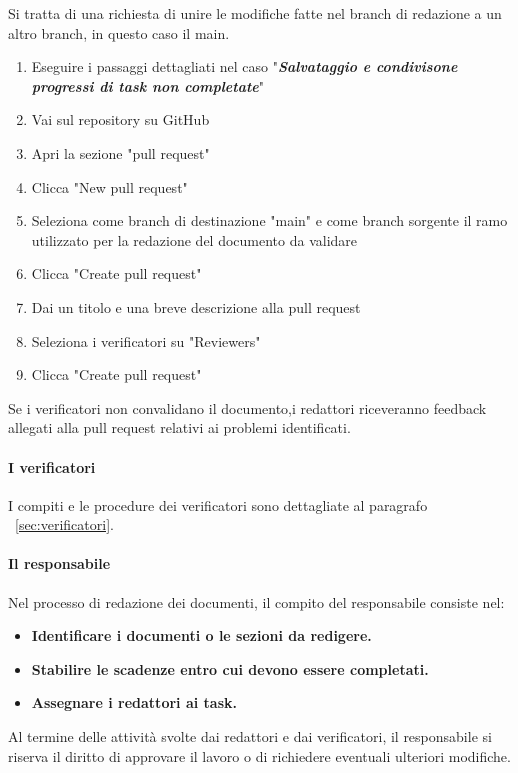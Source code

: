 \documentclass{article}
\begin{document}
    Si tratta di una richiesta di unire le modifiche fatte nel branch di redazione a un altro branch, in questo caso il main.
    \begin{enumerate}
        \item Eseguire i passaggi dettagliati nel caso "\textit{\textbf{Salvataggio e condivisone progressi di task non completate}}"
        \item Vai sul repository su GitHub
        \item Apri la sezione "pull request"
        \item Clicca "New pull request"
        \item Seleziona come branch di destinazione "main" e come branch sorgente il ramo utilizzato per la redazione del documento da validare
        \item Clicca "Create pull request"
        \item Dai un titolo e una breve descrizione alla pull request
        \item Seleziona i verificatori su "Reviewers"
        \item Clicca "Create pull request"
    \end{enumerate}
    
   Se i verificatori non convalidano il documento,i redattori riceveranno feedback allegati alla pull request relativi ai problemi identificati.
   \paragraph{I verificatori}
   I compiti e le procedure dei verificatori sono dettagliate al paragrafo ~\ref{sec:verificatori}. 
    \paragraph{Il responsabile}
    Nel processo di redazione dei documenti, il compito del responsabile consiste nel: 
        \begin{itemize}
        \item \textbf{Identificare i documenti o le sezioni da redigere. }
        \item \textbf{Stabilire le scadenze entro cui devono essere completati.}
        \item \textbf{Assegnare i redattori ai task.}
    \end{itemize}
    Al termine delle attività svolte dai redattori e dai verificatori, il responsabile si riserva il diritto di approvare il lavoro o di richiedere eventuali ulteriori modifiche.
\end{document}
